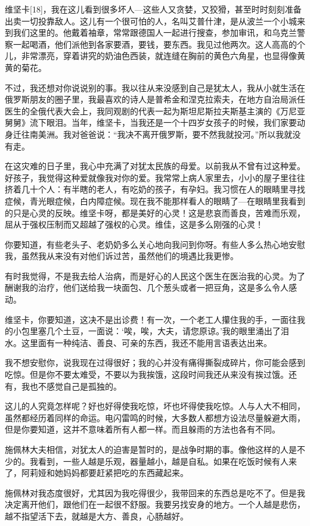 维坚卡[18]，我在这儿看到很多坏人—这些人又贪婪，又狡猾，甚至时时刻刻准备出卖一切投靠敌人。这儿有一个很可怕的人，名叫艾普什津，是从波兰一个小城来到我们这里的。他戴着袖章，常常跟德国人一起进行搜查，参加审讯，和乌克兰警察一起喝酒，他们派他到各家要酒，要钱，要东西。我见过他两次。这人高高的个儿，非常漂亮，穿着讲究的奶油色西装，就连缝在胸前的黄色六角星，也显得像黄黄的菊花。

不过，我还想对你说说别的事。我以往从来没感到自己是犹太人，我从小就生活在俄罗斯朋友的圈子里，我最喜欢的诗人是普希金和涅克拉索夫，在地方自治局派任医生的全俄代表大会上，我同观剧的代表一起为斯坦尼斯拉夫斯基主演的《万尼亚舅舅》流下眼泪。当年，维坚卡，当我还是一个十四岁女孩子的时候，我们家要动身迁往南美洲。我对爸爸说：“我决不离开俄罗斯，要不然我就投河。”所以我就没有走。

在这灾难的日子里，我心中充满了对犹太民族的母爱。以前我从不曾有过这种爱。好孩子，我觉得这种爱就像我对你的爱。我常常上病人家里去，小小的屋子里往往挤着几十个人：有半瞎的老人，有吃奶的孩子，有孕妇。我习惯在人的眼睛里寻找症候，青光眼症候，白内障症候。现在我不能那样看人的眼睛了—在眼睛里我看到的只是心灵的反映。维坚卡呀，都是美好的心灵！这是悲哀而善良，苦难而乐观，屈从于强权压制而又超越了强权的心灵。维佳，这是多么刚强的心灵！

你要知道，有些老头子、老奶奶多么关心地向我问到你呀。有些人多么热心地安慰我，虽然我从来没有对他们诉过苦，虽然他们的境遇比我更惨。

有时我觉得，不是我去给人治病，而是好心的人民这个医生在医治我的心灵。为了酬谢我的治疗，他们送给我一块面包、几个葱头或者一把豆角，这是多么令人感动。

维坚卡，你要知道，这决不是出诊费！有一次，一个老工人攥住我的手，一面往我的小包里塞几个土豆，一面说：‘唉，唉，大夫，请您原谅。’我的眼里涌出了泪水。这里面有一种纯洁、善良、可亲的东西，我还不能用言语表达出来。

我不想安慰你，说我现在过得很好；我的心并没有痛得撕裂成碎片，你可能会感到吃惊。但是你不要太难受，不要以为我挨饿，这段时间我还从来没有挨过饿。还有，我也不感觉自己是孤独的。

这儿的人究竟怎样呢？好也好得使我吃惊，坏也坏得使我吃惊。人与人大不相同，虽然都经历着同样的命运。电闪雷鸣的时候，大多数人都想方设法尽量躲避大雨，但是你要知道，这并不意味着所有人都一样。而且躲雨的方法也各有不同。

施佩林大夫相信，对犹太人的迫害是暂时的，是战争时期的事。像他这样的人是不少的。我看到，一些人越是乐观，器量越小，越是自私。如果在吃饭时候有人来了，阿莉娅和她妈妈都要赶紧把吃的东西藏起来。

施佩林对我态度很好，尤其因为我吃得很少，我带回来的东西总是吃不了。但是我决定离开他们，跟他们在一起很不舒服。我要另找安身的地方。一个人越是悲伤，越不指望活下去，就越是大方、善良，心肠越好。

